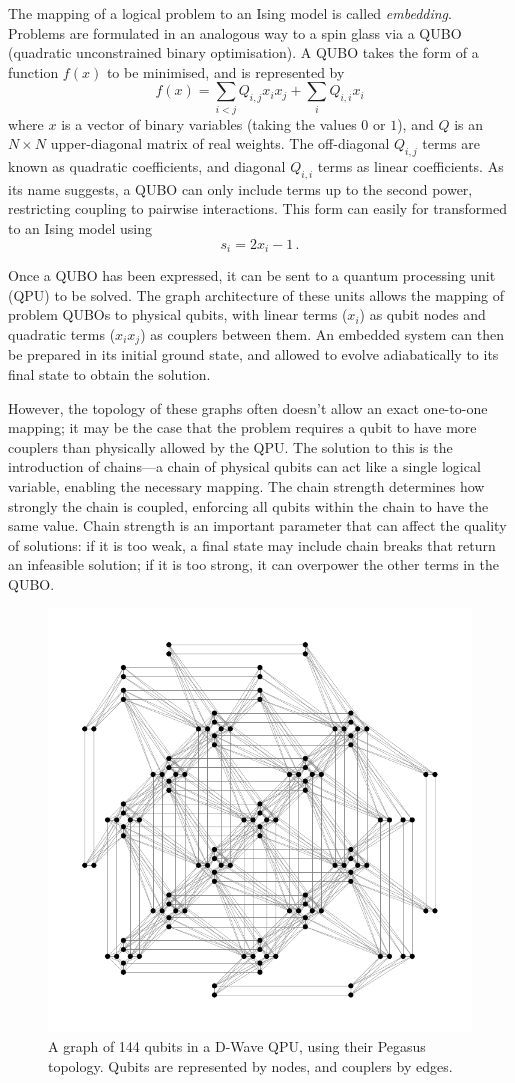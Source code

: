 \documentclass[aps,pra,12pt,onecolumn]{revtex4-2}
\begin{document}
The mapping of a logical problem to an Ising model is called \textit{embedding}. Problems are formulated in an analogous way to a spin glass via a QUBO (quadratic unconstrained binary optimisation). A QUBO takes the form of a function $f(x)$ to be minimised, and is represented by
\begin{equation}
    f(x)=\sum_{i<j}Q_{i,j}x_ix_j + \sum_iQ_{i,i}x_i
    \label{eq:QUBO}
\end{equation}
where $x$ is a vector of binary variables (taking the values $0$ or $1$), and $Q$ is an $N\times N$ upper-diagonal matrix of real weights. The off-diagonal $Q_{i,j}$ terms are known as quadratic coefficients, and diagonal $Q_{i,i}$ terms as linear coefficients. As its name suggests, a QUBO can only include terms up to the second power, restricting coupling to pairwise interactions.
This form can easily for transformed to an Ising model using
\begin{equation}
    s_i = 2x_i - 1 \,.
    \label{eq:qubo-ising}
\end{equation}

Once a QUBO has been expressed, it can be sent to a quantum processing unit (QPU) to be solved. The graph architecture of these units allows the mapping of problem QUBOs to physical qubits, with linear terms ($x_i$) as qubit nodes and quadratic terms ($x_ix_j$) as couplers between them. An embedded system can then be prepared in its initial ground state, and allowed to evolve adiabatically to its final state to obtain the solution.

However, the topology of these graphs often doesn't allow an exact one-to-one mapping; it may be the case that the problem requires a qubit to have more couplers than physically allowed by the QPU. The solution to this is the introduction of chains—a chain of physical qubits can act like a single logical variable, enabling the necessary mapping. The chain strength determines how strongly the chain is coupled, enforcing all qubits within the chain to have the same value. Chain strength is an important parameter that can affect the quality of solutions: if it is too weak, a final state may include chain breaks that return an infeasible solution; if it is too strong, it can overpower the other terms in the QUBO.

\begin{figure}[b]
    \centering
    \includegraphics[width=0.5\linewidth]{../Figures/pegasus.pdf}
    \caption{A graph of 144 qubits in a D-Wave QPU, using their Pegasus topology. Qubits are represented by nodes, and couplers by edges.}
    \label{fig:pegasus}
\end{figure}
\end{document}
